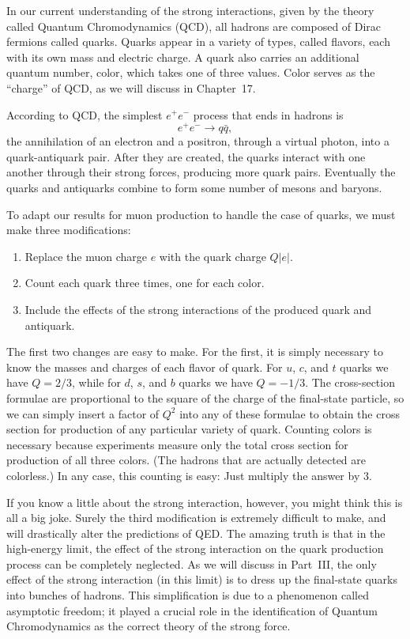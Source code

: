 In our current understanding of the strong interactions, given by the theory
called Quantum Chromodynamics (QCD), all hadrons are composed of Dirac
fermions called quarks.  Quarks appear in a variety of types, called flavors,
each with its own mass and electric charge.  A quark also carries an
additional quantum number, color, which takes one of three values.  Color
serves as the ``charge'' of QCD, as we will discuss in Chapter~17.

According to QCD, the simplest $e^{+}e^{-}$ process that ends in hadrons is
\begin{equation}
  e^{+}e^{-} \to q\bar{q},
\end{equation}
the annihilation of an electron and a positron, through a virtual photon, into
a quark-antiquark pair.  After they are created, the quarks interact with one
another through their strong forces, producing more quark pairs.  Eventually
the quarks and antiquarks combine to form some number of mesons and baryons.

To adapt our results for muon production to handle the case of quarks, we must
make three modifications:
\begin{enumerate}
  \item Replace the muon charge $e$ with the quark charge $Q|e|$.
  \item Count each quark three times, one for each color.
  \item Include the effects of the strong interactions of the produced quark
    and antiquark.
\end{enumerate}
The first two changes are easy to make.  For the first, it is simply necessary
to know the masses and charges of each flavor of quark.  For $u$, $c$, and $t$
quarks we have $Q = 2/3$, while for $d$, $s$, and $b$ quarks we have
$Q = -1/3$.  The cross-section formulae are proportional to the square of the
charge of the final-state particle, so we can simply insert a factor of $Q^2$
into any of these formulae to obtain the cross section for production of any
particular variety of quark.  Counting colors is necessary because experiments
measure only the total cross section for production of all three colors.  (The
hadrons that are actually detected are colorless.)  In any case, this counting
is easy: Just multiply the answer by 3.

If you know a little about the strong interaction, however, you might think
this is all a big joke.  Surely the third modification is extremely difficult
to make, and will drastically alter the predictions of QED.  The amazing truth
is that in the high-energy limit, the effect of the strong interaction on the
quark production process can be completely neglected.  As we will discuss in
Part~III, the only effect of the strong interaction (in this limit) is to
dress up the final-state quarks into bunches of hadrons.  This simplification
is due to a phenomenon called asymptotic freedom; it played a crucial role in
the identification of Quantum Chromodynamics as the correct theory of the
strong force.

